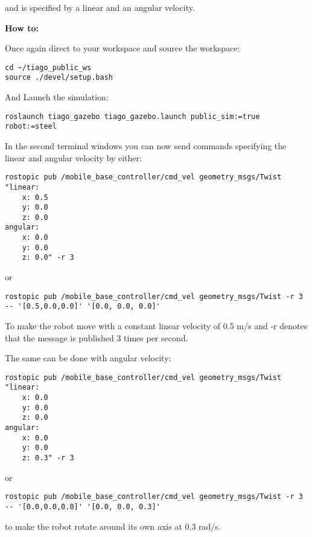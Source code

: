 and is specified by a linear and an angular velocity.

\textbf{How to:}

Once again direct to your workspace and source the workspace:

\begin{verbatim}
cd ~/tiago_public_ws
source ./devel/setup.bash
\end{verbatim}

And Launch the simulation:

\begin{verbatim}
roslaunch tiago_gazebo tiago_gazebo.launch public_sim:=true robot:=steel
\end{verbatim}

In the second terminal windows you can now send commands specifying the linear and angular velocity by either:

\begin{verbatim}
rostopic pub /mobile_base_controller/cmd_vel geometry_msgs/Twist "linear:
	x: 0.5
	y: 0.0
	z: 0.0
angular:
	x: 0.0
	y: 0.0
	z: 0.0" -r 3
\end{verbatim}

or

\begin{verbatim}
rostopic pub /mobile_base_controller/cmd_vel geometry_msgs/Twist -r 3 -- '[0.5,0.0,0.0]' '[0.0, 0.0, 0.0]'
\end{verbatim}

To make the robot move with a constant linear velocity of 0.5 m/s and -r denotes that the message is published 3 times per second.

The same can be done with angular velocity:

\begin{verbatim}
rostopic pub /mobile_base_controller/cmd_vel geometry_msgs/Twist "linear:
	x: 0.0
	y: 0.0
	z: 0.0
angular:
	x: 0.0
	y: 0.0
	z: 0.3" -r 3
\end{verbatim}

or 

\begin{verbatim}
rostopic pub /mobile_base_controller/cmd_vel geometry_msgs/Twist -r 3 -- '[0.0,0.0,0.0]' '[0.0, 0.0, 0.3]'
\end{verbatim}

to make the robot rotate around its own axis at 0.3 rad/s.

